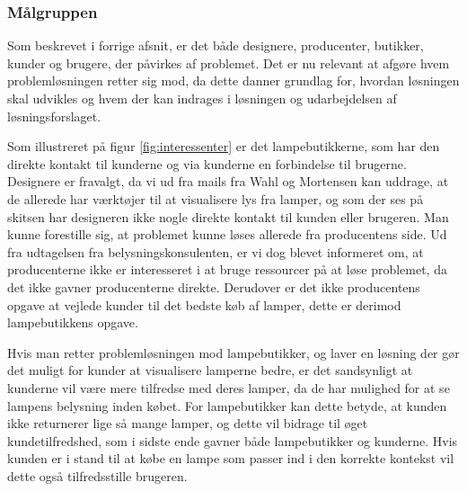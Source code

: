 \subsubsection{Målgruppen}
Som beskrevet i forrige afsnit, er det både designere, producenter, butikker, kunder og brugere, der påvirkes af problemet. Det er nu relevant at afgøre hvem problemløsningen retter sig mod, da dette danner grundlag for, hvordan løsningen skal udvikles og hvem der kan indrages i løsningen og udarbejdelsen af løsningsforslaget.

Som illustreret på figur \ref{fig:interessenter} er det lampebutikkerne, som har den direkte kontakt til kunderne og via kunderne en forbindelse til brugerne. Designere er fravalgt, da vi ud fra mails fra Wahl og Mortensen kan uddrage, at de allerede har værktøjer til at visualisere lys fra lamper, og som der ses på skitsen har designeren ikke nogle direkte kontakt til kunden eller brugeren. Man kunne forestille sig, at problemet kunne løses allerede fra producentens side. Ud fra udtagelsen fra belysningskonsulenten, er vi dog blevet informeret om, at producenterne ikke er interesseret i at bruge ressourcer på at løse problemet, da det ikke gavner producenterne direkte. Derudover er det ikke producentens opgave at vejlede kunder til det bedste køb af lamper, dette er derimod lampebutikkens opgave.

Hvis man retter problemløsningen mod lampebutikker, og laver en løsning der gør det muligt for kunder at visualisere lamperne bedre, er det sandsynligt at kunderne vil være mere tilfredse med deres lamper, da de har mulighed for at se lampens belysning inden købet. For lampebutikker kan dette betyde, at kunden ikke returnerer lige så mange lamper, og dette vil bidrage til øget kundetilfredshed, som i sidste ende gavner både lampebutikker og kunderne. Hvis kunden er i stand til at købe en lampe som passer ind i den korrekte kontekst vil dette også tilfredsstille brugeren. 